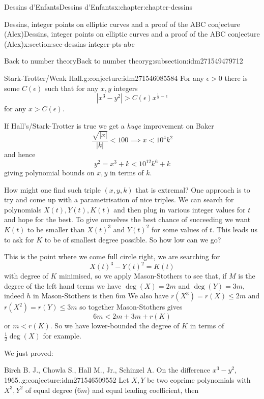 \documentclass[oneside,10pt,]{book}
\numberwithin{equation}{section}
\newcommand{\lt}{<}
\newcommand{\gt}{>}
\begin{document}
\begin{chapterptx}{Dessins d'Enfants}{}{Dessins d'Enfants}{}{}{x:chapter:chapter-dessins}
\begin{sectionptx}{Dessins, integer points on elliptic curves and a proof of the ABC conjecture (Alex)}{}{Dessins, integer points on elliptic curves and a proof of the ABC conjecture (Alex)}{}{}{x:section:sec-dessins-integer-pts-abc}
\begin{subsectionptx}{Back to number theory}{}{Back to number theory}{}{}{g:subsection:idm271549479712}
\begin{conjecture}{Stark-Trotter\slash{}Weak Hall.}{}{g:conjecture:idm271546085584}%
For any  \(\epsilon \gt 0\) there is some \(C(\epsilon)\) such that for any \(x,y\) integers%
\begin{equation*}
|x^3 - y^2| \gt C(\epsilon) x^{\frac12 - \epsilon}
\end{equation*}
for any \(x \gt C(\epsilon)\).%
\end{conjecture}
If Hall's\slash{}Stark-Trotter is true we get a \emph{huge} improvement on Baker%
\begin{equation*}
\frac{\sqrt{|x|}}{|k|} \lt 100 \implies x \lt 10^4k^2
\end{equation*}
and hence%
\begin{equation*}
y^2 = x^3 + k \lt 10^{12}k^6 + k
\end{equation*}
giving polynomial bounds on \(x,y\) in terms of \(k\).%
\par
How might one find such triple \((x,y,k)\) that is extremal? One approach is to try and come up with a parametrisation of nice triples. We can search for polynomials \(X(t),Y(t), K(t)\) and then plug in various integer values for \(t\) and hope for the best. To give ourselves the best chance of succeeding we want \(K(t)\) to be smaller than \(X(t)^3\) and \(Y(t)^2\) for some values of \(t\). This leads us to ask for \(K\) to be of smallest degree possible. So how low can we go?%
\par
This is the point where we come full circle right, we are searching for%
\begin{equation*}
X(t)^3 - Y(t)^2 = K(t)
\end{equation*}
with degree of \(K\) minimised, so we apply Mason-Stothers to see that, if \(M\) is the degree of the left hand terms we have \(\deg(X) = 2m\) and \(\deg (Y) = 3m\), indeed \(h\) in Mason-Stothers is then \(6m\) We also have \(r(X^3) = r(X) \le 2m\) and \(r(X^2) = r(Y) \le 3m\) so together Mason-Stothers gives%
\begin{equation*}
6m \lt 2m + 3m + r(K)
\end{equation*}
or \(m \lt r(K)\). So we have lower-bounded the degree of \(K\) in terms of \(\frac 12 \deg(X)\) for example.%
\par
We just proved:%
\begin{conjecture}{Birch B. J., Chowla S., Hall M., Jr., Schinzel A. On the difference \(x^3 - y^2\), 1965..}{}{g:conjecture:idm271546509552}%
Let \(X, Y\) be two coprime polynomials with \(X^3,Y^2\) of equal degree (\(6m\)) and equal leading coefficient, then%

\end{conjecture}
\end{subsectionptx}
\end{sectionptx}
\end{chapterptx}
\end{document}
